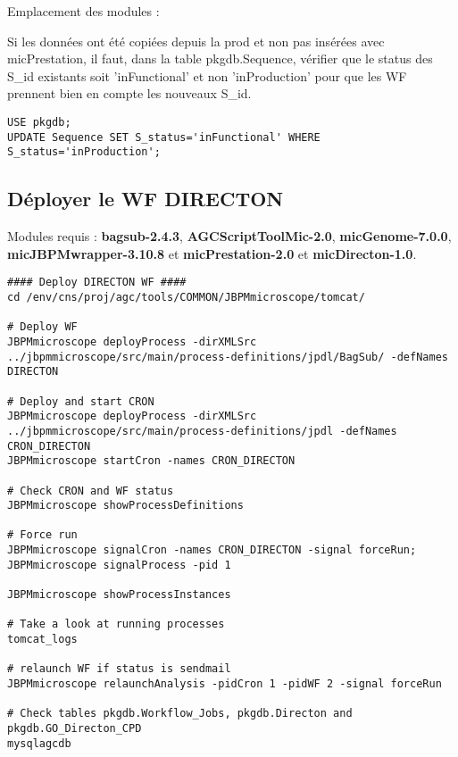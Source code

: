Emplacement des modules : 
\newline

\begin{mycolorbox}
	Si les données ont été copiées depuis la prod et non pas insérées avec micPrestation, il faut, dans la table pkgdb.Sequence, vérifier que le status des S\_id existants soit 'inFunctional' et non 'inProduction' pour que les WF prennent bien en compte les nouveaux S\_id.
\end{mycolorbox}

\begin{lstlisting}[style=SQL]
USE pkgdb;
UPDATE Sequence SET S_status='inFunctional' WHERE S_status='inProduction';
\end{lstlisting}

\subsection{Déployer le WF DIRECTON}
Modules requis : \textbf{bagsub-2.4.3}, \textbf{AGCScriptToolMic-2.0}, \textbf{micGenome-7.0.0}, \textbf{micJBPMwrapper-3.10.8} et \textbf{micPrestation-2.0} et \textbf{micDirecton-1.0}.

\begin{lstlisting}[style=bash]
#### Deploy DIRECTON WF ####
cd /env/cns/proj/agc/tools/COMMON/JBPMmicroscope/tomcat/

# Deploy WF
JBPMmicroscope deployProcess -dirXMLSrc ../jbpmmicroscope/src/main/process-definitions/jpdl/BagSub/ -defNames DIRECTON

# Deploy and start CRON
JBPMmicroscope deployProcess -dirXMLSrc ../jbpmmicroscope/src/main/process-definitions/jpdl -defNames CRON_DIRECTON
JBPMmicroscope startCron -names CRON_DIRECTON

# Check CRON and WF status
JBPMmicroscope showProcessDefinitions

# Force run
JBPMmicroscope signalCron -names CRON_DIRECTON -signal forceRun; JBPMmicroscope signalProcess -pid 1

JBPMmicroscope showProcessInstances

# Take a look at running processes
tomcat_logs

# relaunch WF if status is sendmail
JBPMmicroscope relaunchAnalysis -pidCron 1 -pidWF 2 -signal forceRun

# Check tables pkgdb.Workflow_Jobs, pkgdb.Directon and pkgdb.GO_Directon_CPD
mysqlagcdb
\end{lstlisting}
